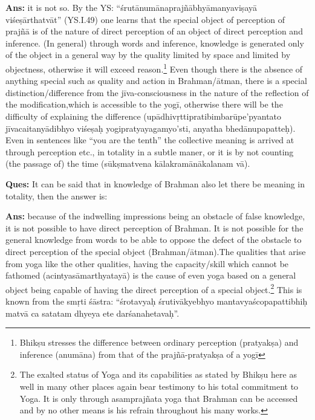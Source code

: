 \textbf{Ans:}  it is not so.  By the YS: “śrutānumānaprajñābhyāmanyaviṣayā viśeṣārthatvāt” (YS.I.49) one learns that the special object of perception of prajñā is of the nature of direct perception of an object of direct perception and inference. (In general) through words and inference, knowledge is generated only of the object in a general way by the quality limited by space and limited by objectness, otherwise it will exceed reason.\footnote{Bhikṣu stresses the difference between ordinary perception (pratyakṣa) and inference (anumāna) from that of the prajñā-pratyakṣa of a yogī} Even though there is the absence of anything special such as quality and action in Brahman/ātman, there is a  special distinction/difference from the jīva-consciousness in the nature of the reflection of the modification,which is accessible to the yogī, otherwise there will be the difficulty of explaining the difference (upādhivṛttipratibimbarūpe’pyantato jīvacaitanyādibhyo viśeṣaḥ yogipratyayagamyo’sti, anyatha bhedānupapatteḥ). Even in sentences like “you are the tenth” the collective meaning is arrived at through perception etc., in totality in a subtle maner, or it is by not counting (the passage of) the time (sūkṣmatvena kālakramānākalanam vā).

\textbf{Ques:} It can be said that in knowledge of Brahman also let there be meaning in totality, then the answer is: 

\textbf{Ans:} because of the indwelling impressions being an obstacle of false knowledge, it is not possible to have direct perception of Brahman. It is not possible for the general knowledge from words to be able to oppose the defect of the obstacle to direct perception of the special object (Brahman/ātman).The qualities that arise from yoga like the other qualities, having the capacity/skill which cannot be fathomed (acintyasāmarthyatayā) is the cause of even yoga based on a general object being capable of  having the direct perception of a special object.\footnote{The exalted status of Yoga and its capabilities as stated by Bhikṣu here as well in many other places again bear testimony to his total commitment to Yoga. It is only through asamprajñata yoga that Brahman can be accessed and by no other means is his refrain throughout his many works.} This is known from the smṛti śāstra: “śrotavyaḥ śrutivākyebhyo mantavyaścopapattibhiḥ matvā ca satatam dhyeya ete darśanahetavaḥ”.

